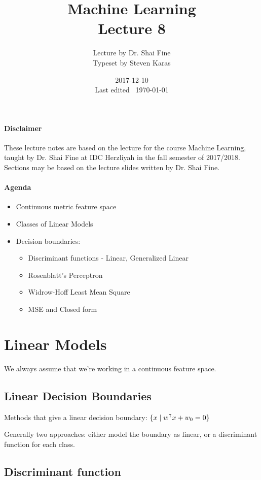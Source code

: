 \documentclass{idc_msc}
\title{Machine Learning\\\large Lecture 8}
\date{2017-12-10 \\ Last edited \currenttime\ \today}
\author{Lecture by Dr. Shai Fine\\Typeset by Steven Karas}
\renewcommand{\T}{{\mathpalette\raiseT\intercal}} %
\begin{document}
\maketitle

\paragraph{Disclaimer}

These lecture notes are based on the lecture for the course Machine Learning, taught by Dr. Shai Fine at IDC Herzliyah in the fall semester of 2017/2018.
Sections may be based on the lecture slides written by Dr. Shai Fine.

\paragraph{Agenda}

\begin{itemize}
  \item Continuous metric feature space
  \item Classes of Linear Models
  \item Decision boundaries:
  \begin{itemize}
    \item Discriminant functions - Linear, Generalized Linear
    \item Rosenblatt's Perceptron
    \item Widrow-Hoff Least Mean Square
    \item MSE and Closed form
  \end{itemize}
\end{itemize}

\section{Linear Models}

We always assume that we're working in a continuous feature space.

\subsection{Linear Decision Boundaries}

Methods that give a linear decision boundary: \(\{x \mid w^\T x + w_0 = 0\}\)

Generally two approaches: either model the boundary as linear, or a discriminant function for each class.

\subsection{Discriminant function}
\end{document}
